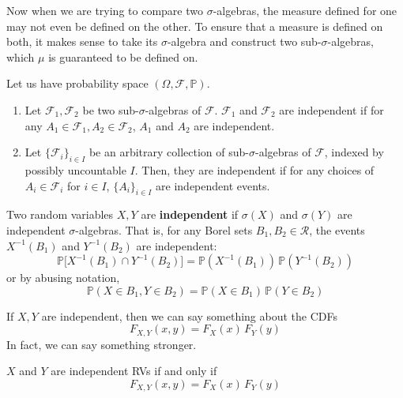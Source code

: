   Now when we are trying to compare two $\sigma$-algebras, the measure defined for one may not even be defined on the other. To ensure that a measure is defined on both, it makes sense to take its $\sigma$-algebra and construct two sub-$\sigma$-algebras, which $\mu$ is guaranteed to be defined on. 

  \begin{definition}
    Let us have probability space $(\Omega, \mathcal{F}, \mathbb{P})$. 
    \begin{enumerate}
      \item Let $\mathcal{F}_1, \mathcal{F}_2$ be two sub-$\sigma$-algebras of $\mathcal{F}$. $\mathcal{F}_1$ and $\mathcal{F}_2$ are independent if for any $A_1 \in \mathcal{F}_1, A_2 \in \mathcal{F}_2$, $A_1$ and $A_2$ are independent. 
      \item Let $\{ \mathcal{F}_i\}_{i \in I}$ be an arbitrary collection of sub-$\sigma$-algebras of $\mathcal{F}$, indexed by possibly uncountable $I$. Then, they are independent if for any choices of $A_i \in \mathcal{F}_i$ for $i \in I$, $\{A_i\}_{i \in I}$ are independent events. 
    \end{enumerate}
  \end{definition}

  \begin{definition}
    Two random variables $X, Y$ are \textbf{independent} if $\sigma(X)$ and $\sigma(Y)$ are independent $\sigma$-algebras. That is, for any Borel sets $B_1, B_2 \in \mathcal{R}$, the events $X^{-1}(B_1)$ and $Y^{-1}(B_2)$ are independent: 
    \begin{equation}
      \mathbb{P}\big[ X^{-1}(B_1) \cap Y^{-1}(B_2) \big] = \mathbb{P}(X^{-1}(B_1)) \, \mathbb{P}(Y^{-1}(B_2))
    \end{equation}
    or by abusing notation, 
    \begin{equation}
      \mathbb{P}(X \in B_1, Y \in B_2) = \mathbb{P}(X \in B_1) \, \mathbb{P}(Y \in B_2)
    \end{equation}
  \end{definition}

  If $X, Y$ are independent, then we can say something about the CDFs 
  \begin{equation}
    F_{X, Y} (x, y) = F_X (x) \, F_Y (y)
  \end{equation}
  In fact, we can say something stronger. 

  \begin{theorem}
    $X$ and $Y$ are independent RVs if and only if 
    \begin{equation}
      F_{X, Y} (x, y) = F_X (x) \, F_Y (y)
    \end{equation}
  \end{theorem}


